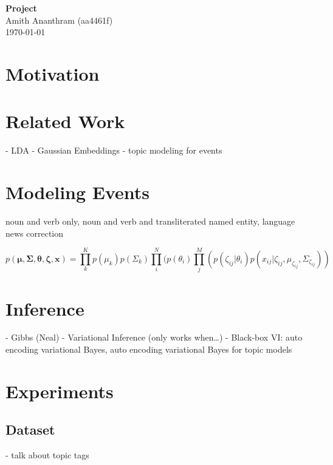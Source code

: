 \documentclass[12pt]{article}
\begin{document}
\begin{flushleft}
\textbf{Project} \\
Amith Ananthram (aa4461f) \\
\today
\end{flushleft}

\vspace{0.1in}

\normalsize

\section{Motivation}

\section{Related Work}

- LDA
- Gaussian Embeddings
- topic modeling for events

\section{Modeling Events}

noun and verb only, noun and verb and transliterated named entity, language news correction

\begin{equation*}
p(\bm{\mu}, \bm{\Sigma}, \bm{\theta}, \bm{\zeta}, \bm{x}) = \prod^{K}_{k} p(\mu_k)p(\Sigma_k)\prod^N_{i}(p(\theta_i)\prod^M_{j}(p(\zeta_{ij} | \theta_i)p(x_{ij} | \zeta_{ij}, \mu_{\zeta_{ij}}, \Sigma_{\zeta_{ij}}))
\end{equation*}

\section{Inference}

- Gibbs (Neal)
				- Variational Inference (only works when…)	
				- Black-box VI: auto encoding variational Bayes, auto encoding variational Bayes for topic models

\section{Experiments}

\subsection{Dataset}

- talk about topic tags
\end{document}
